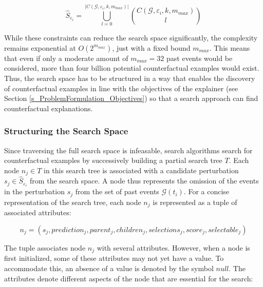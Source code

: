 \begin{equation}
    \hat{S}_{\varepsilon_i} = \bigcup_{l = 0}^{|C(\mathcal{G}, \varepsilon_i, k, m_{max})|} {C(\mathcal{G}, \varepsilon_i, k, m_{max}) \choose l}
\end{equation}

While these constraints can reduce the search space significantly, the complexity remains exponential at $O(2^{m_{max}})$, just with a fixed bound $m_{max}$. This means that even if only a moderate amount of $m_{max} = 32$ past events would be considered, more than four billion potential counterfactual examples would exist. Thus, the search space has to be structured in a way that enables the discovery of counterfactual examples in line with the objectives of the explainer (see Section \ref{s_ProblemFormulation_Objectives}) so that a search approach can find counterfactual explanations.


\subsubsection{Structuring the Search Space}
\label{s_Methodology_SearchSpace_Structure}

Since traversing the full search space is infeasable, search algorithms search for counterfactual examples by successively building a partial search tree $T$. Each node $n_j \in T$ in this search tree is associated with a candidate perturbation $s_j \in \hat{S}_{\varepsilon_i}$ from the search space. A node thus represents the omission of the events in the perturbation $s_j$ from the set of past events $\mathcal{G}(t_i)$. For a concise representation of the search tree, each node $n_j$ is represented as a tuple of associated attributes:

\begin{equation}
    n_j = (s_j, prediction_j, parent_j, children_j, selections_j, score_j, selectable_j)
\end{equation}

The tuple associates node $n_j$ with several attributes. However, when a node is first initialized, some of these attributes may not yet have a value. To accommodate this, an absence of a value is denoted by the symbol $null$. The attributes denote different aspects of the node that are essential for the search:

